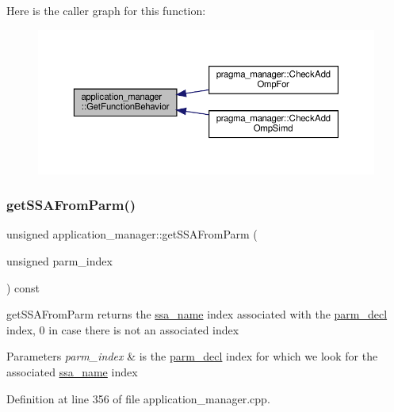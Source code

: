 Here is the caller graph for this function\+:
\nopagebreak
\begin{figure}[H]
\begin{center}
\leavevmode
\includegraphics[width=350pt]{dc/db5/classapplication__manager_ad6feddfe15eda18f0b886c465bc5add4_icgraph}
\end{center}
\end{figure}
\mbox{\label{classapplication__manager_ae5944dcfaf586cd7109e762136f29a43}} 
\subsubsection{\texorpdfstring{get\+S\+S\+A\+From\+Parm()}{getSSAFromParm()}}
{\footnotesize\ttfamily unsigned application\+\_\+manager\+::get\+S\+S\+A\+From\+Parm (\begin{DoxyParamCaption}\item[{unsigned}]{parm\+\_\+index }\end{DoxyParamCaption}) const}



get\+S\+S\+A\+From\+Parm returns the \hyperlink{structssa__name}{ssa\+\_\+name} index associated with the \hyperlink{structparm__decl}{parm\+\_\+decl} index, 0 in case there is not an associated index 


\begin{DoxyParams}{Parameters}
{\em parm\+\_\+index} & is the \hyperlink{structparm__decl}{parm\+\_\+decl} index for which we look for the associated \hyperlink{structssa__name}{ssa\+\_\+name} index \\
\hline
\end{DoxyParams}


Definition at line 356 of file application\+\_\+manager.\+cpp.



